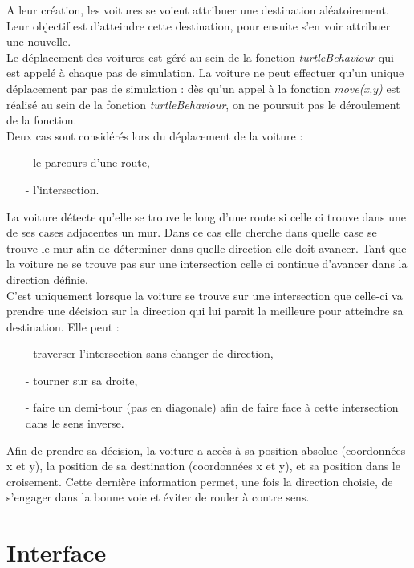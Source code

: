 \documentclass[a4paper,12pt]{report}
\begin{document}
A leur création, les voitures se voient attribuer une destination aléatoirement. Leur objectif est d'atteindre cette destination, pour ensuite s'en voir attribuer une nouvelle. \\

Le déplacement des voitures est géré au sein de la fonction \emph{turtleBehaviour} qui est appelé à chaque pas de simulation. La voiture ne peut effectuer qu'un unique déplacement par pas de simulation : dès qu'un appel à la fonction \emph{move(x,y)} est réalisé au sein de la fonction \emph{turtleBehaviour}, on ne poursuit pas le déroulement de la fonction. \\

Deux cas sont considérés lors du déplacement de la voiture :
\begin{itemize}
\item[-] le parcours d'une route,
\item[-] l'intersection. \\
\end{itemize}

La voiture détecte qu'elle se trouve le long d'une route si celle ci trouve dans une de ses cases adjacentes un mur. Dans ce cas elle cherche dans quelle case se trouve le mur afin de déterminer dans quelle direction elle doit avancer. Tant que la voiture ne se trouve pas sur une intersection celle ci continue d'avancer dans la direction définie. \\

C'est uniquement lorsque la voiture se trouve sur une intersection que celle-ci va prendre une décision sur la direction qui lui parait la meilleure pour atteindre sa destination. Elle peut :
\begin{itemize}
\item[-] traverser l'intersection sans changer de direction,
\item[-] tourner sur sa droite,
\item[-] faire un demi-tour (pas en diagonale) afin de faire face à cette intersection dans le sens inverse.\\
\end{itemize}

Afin de prendre sa décision, la voiture a accès à sa position absolue (coordonnées x et y), la position de sa destination (coordonnées x et y), et sa position dans le croisement. Cette dernière information permet, une fois la direction choisie, de s'engager dans la bonne voie et éviter de rouler à contre sens.

\section{Interface}
\end{document}
